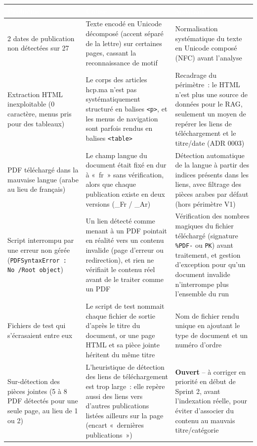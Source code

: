 \documentclass[11pt,a4paper]{article}
\newcommand{\tblhead}[1]{\textcolor{white}{\textbf{#1}}}
\begin{document}
\begin{longtable}{@{}p{4cm}p{5.2cm}p{6cm}@{}}
\rowcolor{navy}
\tblhead{Probl\`eme} & \tblhead{Cause} & \tblhead{Solution} \\
\midrule
\endhead
2 dates de publication non d\'etect\'ees sur 27 & Texte encod\'e en Unicode d\'ecompos\'e (accent s\'epar\'e de la lettre) sur certaines pages, cassant la reconnaissance de motif & Normalisation syst\'ematique du texte en Unicode compos\'e (NFC) avant l'analyse \\
Extraction HTML inexploitable (0 caract\`ere, menus pris pour des tableaux) & Le corps des articles hcp.ma n'est pas syst\'ematiquement structur\'e en balises \texttt{<p>}, et les menus de navigation sont parfois rendus en balises \texttt{<table>} & Recadrage du p\'erim\`etre~: le HTML n'est plus une source de donn\'ees pour le RAG, seulement un moyen de rep\'erer les liens de t\'el\'echargement et le titre/date (ADR 0003) \\
PDF t\'el\'echarg\'e dans la mauvaise langue (arabe au lieu de fran\c{c}ais) & Le champ langue du document \'etait fix\'e en dur \`a «~fr~» sans v\'erification, alors que chaque publication existe en deux versions (\_Fr / \_Ar) & D\'etection automatique de la langue \`a partir des indices pr\'esents dans les liens, avec filtrage des pi\`eces arabes par d\'efaut (hors p\'erim\`etre V1) \\
Script interrompu par une erreur non g\'er\'ee (\texttt{PDFSyntaxError~: No~/Root~object}) & Un lien d\'etect\'e comme menant \`a un PDF pointait en r\'ealit\'e vers un contenu invalide (page d'erreur ou redirection), et rien ne v\'erifiait le contenu r\'eel avant de le traiter comme un PDF & V\'erification des nombres magiques du fichier t\'el\'echarg\'e (signature \texttt{\%PDF-} ou \texttt{PK}) avant traitement, et gestion d'exception pour qu'un document invalide n'interrompe plus l'ensemble du run \\
Fichiers de test qui s'\'ecrasaient entre eux & Le script de test nommait chaque fichier de sortie d'apr\`es le titre du document, or une page HTML et sa pi\`ece jointe h\'eritent du m\^eme titre & Nom de fichier rendu unique en ajoutant le type de document et un num\'ero d'ordre \\
\rowcolor{lightgrey} Sur-d\'etection des pi\`eces jointes (5 \`a 8 PDF d\'etect\'es pour une seule page, au lieu de 1 ou 2) & L'heuristique de d\'etection des liens de t\'el\'echargement est trop large~: elle rep\`ere aussi des liens vers d'autres publications list\'ees ailleurs sur la page (encart «~derni\`eres publications~») & \textbf{Ouvert} -- \`a corriger en priorit\'e en d\'ebut de Sprint 2, avant l'indexation r\'eelle, pour \'eviter d'associer du contenu au mauvais titre/cat\'egorie \\
\end{longtable}
\end{document}
